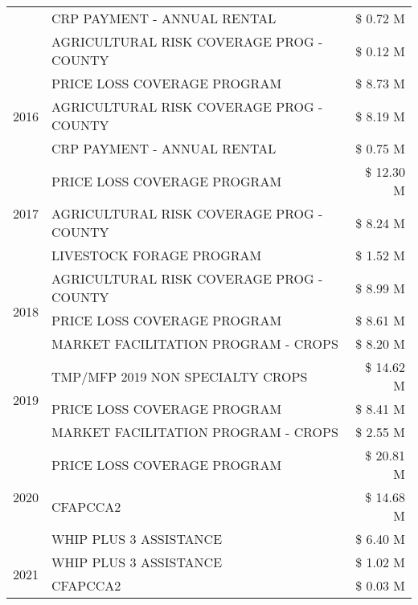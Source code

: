 \begin{tabular}{llr}
 & CRP PAYMENT - ANNUAL RENTAL & \$ 0.72 M \\
 & AGRICULTURAL RISK COVERAGE PROG - COUNTY & \$ 0.12 M \\
\cline{1-3}
\multirow[t]{3}{*}{2016} & PRICE LOSS COVERAGE PROGRAM & \$ 8.73 M \\
 & AGRICULTURAL RISK COVERAGE PROG - COUNTY & \$ 8.19 M \\
 & CRP PAYMENT - ANNUAL RENTAL & \$ 0.75 M \\
\cline{1-3}
\multirow[t]{3}{*}{2017} & PRICE LOSS COVERAGE PROGRAM & \$ 12.30 M \\
 & AGRICULTURAL RISK COVERAGE PROG - COUNTY & \$ 8.24 M \\
 & LIVESTOCK FORAGE PROGRAM & \$ 1.52 M \\
\cline{1-3}
\multirow[t]{3}{*}{2018} & AGRICULTURAL RISK COVERAGE PROG - COUNTY & \$ 8.99 M \\
 & PRICE LOSS COVERAGE PROGRAM & \$ 8.61 M \\
 & MARKET FACILITATION PROGRAM - CROPS & \$ 8.20 M \\
\cline{1-3}
\multirow[t]{3}{*}{2019} & TMP/MFP 2019 NON SPECIALTY CROPS & \$ 14.62 M \\
 & PRICE LOSS COVERAGE PROGRAM & \$ 8.41 M \\
 & MARKET FACILITATION PROGRAM - CROPS & \$ 2.55 M \\
\cline{1-3}
\multirow[t]{3}{*}{2020} & PRICE LOSS COVERAGE PROGRAM & \$ 20.81 M \\
 & CFAPCCA2 & \$ 14.68 M \\
 & WHIP PLUS 3 ASSISTANCE & \$ 6.40 M \\
\cline{1-3}
\multirow[t]{2}{*}{2021} & WHIP PLUS 3 ASSISTANCE & \$ 1.02 M \\
 & CFAPCCA2 & \$ 0.03 M \\
\cline{1-3}
\bottomrule
\end{tabular}
